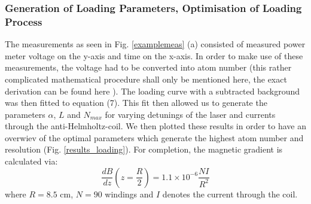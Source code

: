 \documentclass[12pt, a4paper]{article}
\begin{document}
\subsubsection{Generation of Loading Parameters, Optimisation of Loading Process}
The measurements as seen in Fig. \ref{examplemeas} (a) consisted of measured power meter voltage on the y-axis and time on the x-axis. In order to make use of these measurements, the voltage had to be converted into atom number (this rather complicated mathematical procedure shall only be mentioned here, the exact derivation can be found here \cite{script}). The loading curve with a subtracted background was then fitted to equation (7). This fit then allowed us to generate the parameters $\alpha$, $L$ and $N_{max}$ for varying detunings of the laser and currents through the anti-Helmholtz-coil. We then plotted these results in order to have an overwiev of the optimal parameters which generate the highest atom number and resolution (Fig. \ref{results_loading}). For completion, the magnetic gradient is calculated via:
\begin{equation}
\frac{dB}{dz}(z=\frac{R}{2})=1.1\times 10^{-6}\frac{NI}{R^2}
\end{equation}
where $R=8.5$ cm, $N=90$ windings and $I$ denotes the current through the coil.
\end{document}
